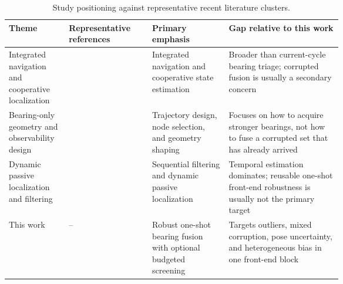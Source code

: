 \begin{table}[!htbp]
\centering
\caption{Study positioning against representative recent literature clusters.}
\label{tab:litposition}
\footnotesize
\setlength{\tabcolsep}{4pt}
\renewcommand{\arraystretch}{1.02}
\begin{tabularx}{\linewidth}{>{\RaggedRight\arraybackslash}p{0.18\linewidth}>{\RaggedRight\arraybackslash}p{0.25\linewidth}>{\RaggedRight\arraybackslash}p{0.23\linewidth}>{\RaggedRight\arraybackslash}X}
\toprule
Theme & Representative references & Primary emphasis & Gap relative to this work \\
\midrule
Integrated navigation and cooperative localization & \cite{yang2020tightly,dai2022uav,yang2024distributed,qian2025cooperative,li2025tcdrl} & Integrated navigation and cooperative state estimation & Broader than current-cycle bearing triage; corrupted fusion is usually a secondary concern \\
Bearing-only geometry and observability design & \cite{kang2024aoa,zou2024revisit,chen2025variable,dogancay2024bayesian,xing2025node} & Trajectory design, node selection, and geometry shaping & Focuses on how to acquire stronger bearings, not how to fuse a corrupted set that has already arrived \\
Dynamic passive localization and filtering & \cite{chen2025error,luo2025dynamicbearing,yin2025dual,dou2025moving,wu2026bearing} & Sequential filtering and dynamic passive localization & Temporal estimation dominates; reusable one-shot front-end robustness is usually not the primary target \\
This work & -- & Robust one-shot bearing fusion with optional budgeted screening & Targets outliers, mixed corruption, pose uncertainty, and heterogeneous bias in one front-end block \\
\bottomrule
\end{tabularx}
\end{table}
